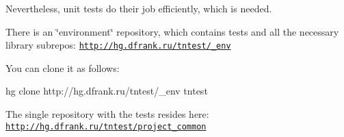 Nevertheless, unit tests do their job efficiently, which is needed.

There is an \char`\"{}environment\char`\"{} repository, which contains tests and all the necessary library subrepos\+: \href{http://hg.dfrank.ru/tntest/_env}{\tt http\+://hg.\+dfrank.\+ru/tntest/\+\_\+env}

You can clone it as follows\+: \begin{DoxyVerb}hg clone http://hg.dfrank.ru/tntest/_env tntest
\end{DoxyVerb}


The single repository with the tests resides here\+: \href{http://hg.dfrank.ru/tntest/project_common}{\tt http\+://hg.\+dfrank.\+ru/tntest/project\+\_\+common} 